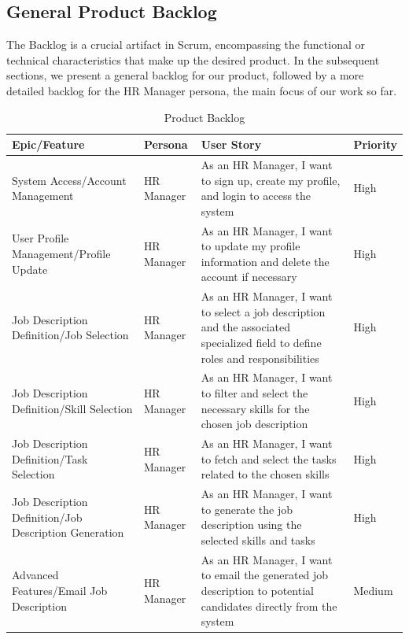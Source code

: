 \subsection{General Product Backlog}
The Backlog is a crucial artifact in Scrum, encompassing the functional or technical characteristics that make up the desired product. In the subsequent sections, we present a general backlog for our product, followed by a more detailed backlog for the HR Manager persona, the main focus of our work so far.


\begin{table}[H]
    \renewcommand{\arraystretch}{1.5}%
    \caption{Product Backlog}
    \centering
    \medskip
    \begin{tabularx}{\textwidth} {
            | >{\hsize=1\hsize\raggedright\arraybackslash}X
            | >{\hsize=0.5\hsize\raggedright\arraybackslash}X
            | >{\hsize=2\hsize\raggedright\arraybackslash}X
            | >{\hsize=0.5\hsize\raggedright\arraybackslash}X |}
        \hline
        \rowcolor{primary} \textbf {Epic/Feature} & \textbf {Persona} & \textbf {User Story} & \textbf {Priority} \\
        \hline
        System Access/Account Management & HR Manager & As an HR Manager, I want to sign up, create my profile, and login to access the system & High \\
        \hline
        User Profile Management/Profile Update & HR Manager & As an HR Manager, I want to update my profile information and delete the account if necessary & High \\
        \hline
        Job Description Definition/Job Selection & HR Manager & As an HR Manager, I want to select a job description and the associated specialized field to define roles and responsibilities & High \\
        \hline
        Job Description Definition/Skill Selection & HR Manager & As an HR Manager, I want to filter and select the necessary skills for the chosen job description & High \\
        \hline
        Job Description Definition/Task Selection & HR Manager & As an HR Manager, I want to fetch and select the tasks related to the chosen skills & High \\
        \hline
        Job Description Definition/Job Description Generation & HR Manager & As an HR Manager, I want to generate the job description using the selected skills and tasks & High \\
        \hline
        Advanced Features/Email Job Description & HR Manager & As an HR Manager, I want to email the generated job description to potential candidates directly from the system & Medium \\

\end{tabularx}
\end{table}
